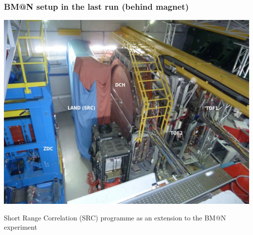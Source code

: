 \documentclass[dvipsnames] {beamer}
\begin{document}
\begin{frame}
  \bf
  \frametitle{\bf \centering BM@N setup in the last run (behind magnet)}
  \begin{minipage}{1.\linewidth}
    \includegraphics[width=1.\linewidth]{detectors_behind_magnet.jpg}
  \end{minipage}
\end{frame}

\begin{frame}
 \bf
  \begin{block}{}
    \begin{center}
      {\Huge Short Range Correlation (SRC) programme as an
        extension to the BM@N experiment}
    \end{center}
  \end{block}  
\end{frame}
\end{document}
